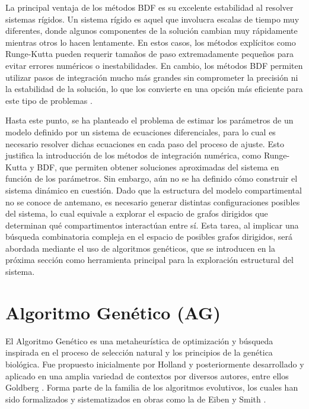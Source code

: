 La principal ventaja de los métodos BDF es su excelente estabilidad al resolver sistemas rígidos. Un sistema rígido es aquel que involucra escalas de tiempo muy 
diferentes, donde algunos componentes de la solución cambian muy rápidamente mientras otros lo hacen lentamente. En estos casos, los métodos explícitos como 
Runge-Kutta pueden requerir tamaños de paso extremadamente pequeños para evitar errores numéricos o inestabilidades. En cambio, los métodos BDF permiten utilizar 
pasos de integración mucho más grandes sin comprometer la precisión ni la estabilidad de la solución, lo que los convierte en una opción más eficiente para este 
tipo de problemas \cite{AscherPetzold98}.

Hasta este punto, se ha planteado el problema de estimar los parámetros de un modelo definido por un sistema de ecuaciones diferenciales, para lo cual es necesario 
resolver dichas ecuaciones en cada paso del proceso de ajuste. Esto justifica la introducción de los métodos de integración numérica, como Runge-Kutta y BDF, que 
permiten obtener soluciones aproximadas del sistema en función de los parámetros. Sin embargo, aún no se ha definido cómo construir el sistema dinámico en cuestión. 
Dado que la estructura del modelo compartimental no se conoce de antemano, es necesario generar distintas configuraciones posibles del sistema, lo cual equivale 
a explorar el espacio de grafos dirigidos que determinan qué compartimentos interactúan entre sí. Esta tarea, al implicar una búsqueda combinatoria compleja en el 
espacio de posibles grafos dirigidos, será abordada mediante el uso de algoritmos genéticos, que se introducen en la próxima sección como herramienta principal para 
la exploración estructural del sistema.

\section{Algoritmo Genético (AG)}
\label{sec:ag}

El Algoritmo Genético es una metaheurística de optimización y búsqueda inspirada en el proceso de selección natural y los principios de la genética biológica. 
Fue propuesto inicialmente por Holland \cite{Holland75} y posteriormente desarrollado y aplicado en una amplia variedad de contextos por diversos autores, 
entre ellos Goldberg \cite{Goldberg89}. Forma parte de la familia de los algoritmos evolutivos, los cuales han sido formalizados y sistematizados en obras como 
la de Eiben y Smith \cite{EibenSmith15}.

